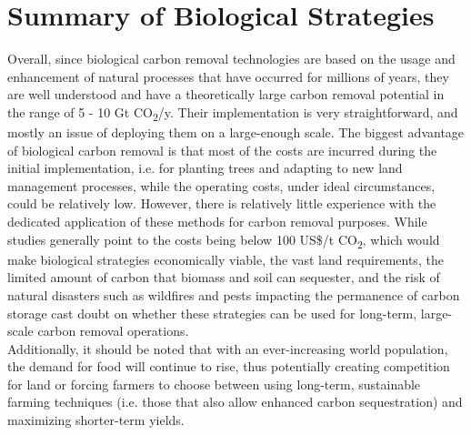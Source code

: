 \section{Summary of Biological Strategies}
Overall, since biological carbon removal technologies are based on the usage and enhancement of natural processes that have occurred for millions of years, they are well understood and have a theoretically large carbon removal potential in the range of 5 - 10 Gt CO\textsubscript{2}/y. Their implementation is very straightforward, and mostly an issue of deploying them on a large-enough scale. The biggest advantage of biological carbon removal is that most of the costs are incurred during the initial implementation, i.e. for planting trees and adapting to new land management processes, while the operating costs, under ideal circumstances, could be relatively low. However, there is relatively little experience with the dedicated application of these methods for carbon removal purposes. While studies generally point to the costs being below 100 US\$/t CO\textsubscript{2}, which would make biological strategies economically viable, the vast land requirements, the limited amount of carbon that biomass and soil can sequester, and the risk of natural disasters such as wildfires and pests impacting the permanence of carbon storage cast doubt on whether these strategies can be used for long-term, large-scale carbon removal operations.\\Additionally, it should be noted that with an ever-increasing world population, the demand for food will continue to rise, thus potentially creating competition for land or forcing farmers to choose between using long-term, sustainable farming techniques (i.e. those that also allow enhanced carbon sequestration) and maximizing shorter-term yields.